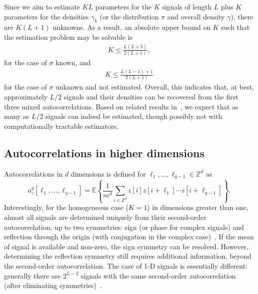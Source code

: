 \documentclass[12pt]{article}
\newcommand{\E}{\mathbb{E}}
\newcommand{\1}{\mathbf{1}}
\theoremstyle{plain}
\theoremstyle{definition}
\theoremstyle{remark}
\theoremstyle{plain}
\theoremstyle{remark}
\theoremstyle{plain}
\theoremstyle{plain}
\theoremstyle{plain}
\numberwithin{equation}{section}
\begin{document}
Since we aim to estimate $KL$ parameters for the $K$ signals of length $L$ plus $K$ parameters for the densities $\gamma_k$ (or the distribution $\pi$ and overall density $\gamma$), there are $K(L+1)$ unknowns. As a result, an absolute upper bound on $K$ such that the estimation problem may be solvable is
\begin{align*}
	K \leq \frac{L(L+5)}{2(L+1)},
\end{align*}
for the case of $\sigma$ known, and
\begin{align*}
	K \leq \frac{ L (L-1) + 1}{2(L+1)}
\end{align*}
for the case of $\sigma$ unknown and not estimated. Overall, this indicates that, at best, approximately $L/2$ signals and their densities can be recovered from the first three mixed autocorrelations. Based on related results in~\cite{bandeira2017estimation}, we expect that as many as $L/2$ signals can indeed be estimated, though possibly not with computationally tractable estimators.



\subsection{Autocorrelations in higher dimensions} \label{sec:high_dimensions}

Autocorrelations in $d$ dimensions is defined for  $\ell_1,\ldots,\ell_{q-1}\in\mathbb{Z}^d$  as 
\begin{equation}
a_z^q[\ell_1,\ldots,\ell_{q-1}]   = \E\left\{\frac{1}{m^d} \sum_{i\in\mathbb{Z}^d} z[i]z[i+\ell_1]\cdots z[i+\ell_{q-1}]\right\}.
\label{eq:ac_d_dimension}
\end{equation}
Interestingly, for the homogeneous case ($K=1$) in dimensions greater than one, almost all  signals are determined uniquely from their second-order autocorrelation, up to two symmetries: sign (or phase for complex signals) and reflection through the origin (with conjugation in the complex case)~\cite{hayes1982reconstruction}. 
If the mean of signal is available and non-zero, the sign symmetry can be resolved. However, determining the reflection symmetry still requires additional information, beyond the second-order autocorrelation.
The case of 1-D signals is essentially different: generally there are $2^{L-2}$ signals with the same second-order autocorrelation (after eliminating  symmetries)~\cite{beinert2015ambiguities,bendory2017fourier}. 
\end{document}
